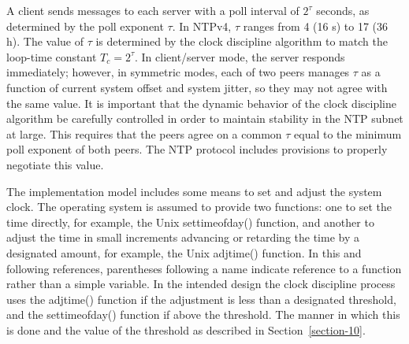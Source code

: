 A client sends messages to each server with a poll interval of $ 2^\tau $
seconds, as determined by the poll exponent $ \tau $. In NTPv4, $ \tau $
ranges from 4 (16 s) to 17 (36 h). The value of $ \tau $ is determined by
the clock discipline algorithm to match the loop-time constant $ T_c = 2^\tau $.
In client/server mode, the server responds immediately;
however, in symmetric modes, each of two peers manages $ \tau $ as a
function of current system offset and system jitter, so they may not
agree with the same value. It is important that the dynamic behavior
of the clock discipline algorithm be carefully controlled in order to
maintain stability in the NTP subnet at large. This requires that
the peers agree on a common $ \tau $ equal to the minimum poll exponent of
both peers. The NTP protocol includes provisions to properly
negotiate this value.

The implementation model includes some means to set and adjust the
system clock. The operating system is assumed to provide two
functions: one to set the time directly, for example, the Unix
settimeofday() function, and another to adjust the time in small
increments advancing or retarding the time by a designated amount,
for example, the Unix adjtime() function. In this and following
references, parentheses following a name indicate reference to a
function rather than a simple variable. In the intended design the
clock discipline process uses the adjtime() function if the
adjustment is less than a designated threshold, and the
settimeofday() function if above the threshold. The manner in which
this is done and the value of the threshold as described in
Section~\ref{section-10}.
